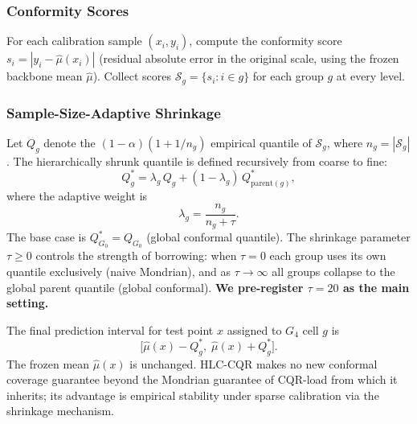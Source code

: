 \documentclass[letterpaper,journal]{IEEEtran}
\begin{document}
\subsubsection{Conformity Scores}
For each calibration sample $(x_i, y_i)$, compute the conformity score
$s_i = |y_i - \hat{\mu}(x_i)|$ (residual absolute error in the
original scale, using the frozen backbone mean $\hat{\mu}$).  Collect scores
$\mathcal{S}_g = \{s_i : i \in g\}$ for each group $g$ at every level.

\subsubsection{Sample-Size-Adaptive Shrinkage}
Let $Q_g$ denote the $(1-\alpha)(1+1/n_g)$ empirical quantile of
$\mathcal{S}_g$, where $n_g = |\mathcal{S}_g|$.  The hierarchically
shrunk quantile is defined recursively from coarse to fine:
\begin{equation}
    Q^{*}_{g} = \lambda_{g}\, Q_{g} + (1-\lambda_{g})\, Q^{*}_{\text{parent}(g)},
    \label{eq:shrinkage}
\end{equation}
where the adaptive weight is
\begin{equation}
    \lambda_{g} = \frac{n_{g}}{n_{g} + \tau}.
    \label{eq:lambda}
\end{equation}
The base case is $Q^{*}_{G_0} = Q_{G_0}$ (global conformal quantile).
The shrinkage parameter $\tau \geq 0$ controls the strength of
borrowing: when $\tau=0$ each group uses its own quantile exclusively
(naive Mondrian), and as $\tau \to \infty$ all groups collapse to the
global parent quantile (global conformal).  \textbf{We pre-register
$\tau=20$ as the main setting.}

The final prediction interval for test point $x$ assigned to $G_4$ cell $g$ is
\begin{equation}
    \bigl[\hat{\mu}(x) - Q^{*}_{g},\; \hat{\mu}(x) + Q^{*}_{g}\bigr].
    \label{eq:interval}
\end{equation}
The frozen mean $\hat{\mu}(x)$ is unchanged.  HLC-CQR makes no new
conformal coverage guarantee beyond the Mondrian guarantee of CQR-load
from which it inherits; its advantage is empirical stability under sparse
calibration via the shrinkage mechanism.
\end{document}
